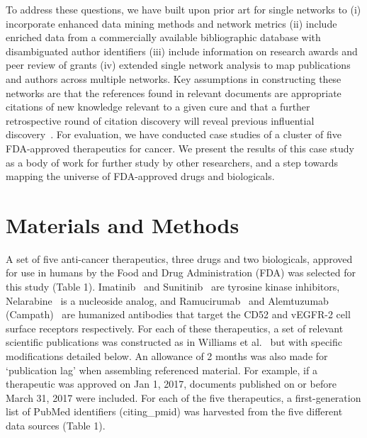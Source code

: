 \documentclass[10pt,letterpaper]{article}
\begin{document}
To address these questions, we have built upon prior art for single networks to (i) incorporate enhanced data mining methods and network metrics (ii) include enriched data from a commercially available bibliographic database with disambiguated author identifiers (iii) include information on research awards and peer review of grants (iv) extended single network analysis to map publications and authors across multiple networks. Key assumptions in constructing these networks are that the references found in relevant documents are appropriate citations of new knowledge relevant to a given cure and that a further retrospective round of citation discovery will reveal previous influential discovery~\cite{bibWilliams}. For evaluation, we have conducted case studies of a cluster of five FDA-approved therapeutics for cancer. We present the results of this case study as a body of work for further study by other researchers, and a step towards mapping the universe of FDA-approved drugs and biologicals. 

\section*{Materials and Methods}  A set of five anti-cancer therapeutics, three drugs and two biologicals, approved for use in humans by the Food and Drug Administration (FDA) was selected for this study (Table 1). Imatinib~\cite{bibImatinib} and Sunitinib~\cite{bibSunitinib} are tyrosine kinase inhibitors, Nelarabine~\cite{bibNelarabine} is a nucleoside analog, and Ramucirumab~\cite{bibRamucirumab} and Alemtuzumab (Campath)~\cite{bibAlemtuzumab} are humanized antibodies that target the CD52 and vEGFR-2 cell surface receptors respectively. For each of these therapeutics, a set of relevant scientific publications was constructed as in Williams et al.~\cite{bibWilliams} but with specific modifications detailed below. An allowance of 2 months was also made for `publication lag' when assembling referenced material. For example, if a therapeutic was approved on Jan 1, 2017, documents published  on or before March 31, 2017 were included. For each of the five therapeutics, a first-generation list of PubMed identifiers (citing\_pmid) was harvested from the five different data sources (Table 1). 
\end{document}
